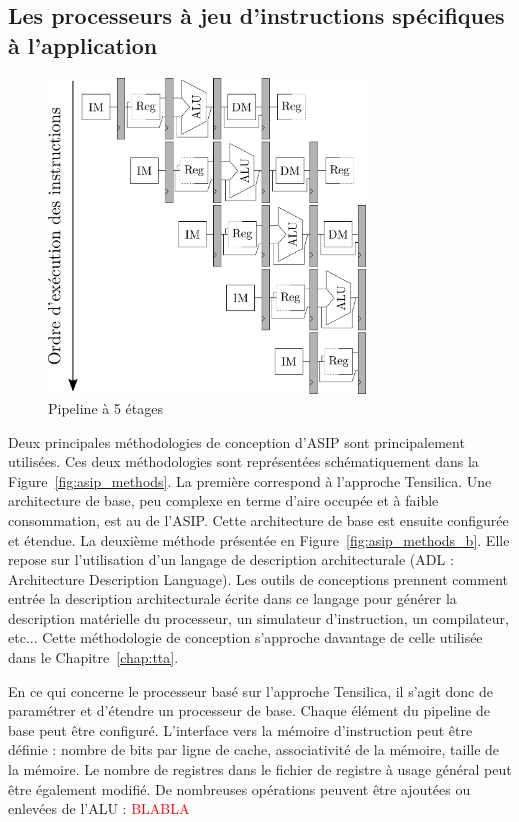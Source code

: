 \subsection{Les processeurs à jeu d'instructions spécifiques à l'application}
\begin{figure}[t]
\centering
\includegraphics[width=0.75\textwidth]{main/ch3_fig/pipelines}
\caption{Pipeline à 5 étages}
\end{figure}
Deux principales méthodologies de conception d'ASIP sont principalement utilisées. Ces deux méthodologies sont représentées schématiquement dans la Figure~\ref{fig:asip_methods}. La première correspond à l'approche Tensilica. Une architecture de base, peu complexe en terme d'aire occupée et à faible consommation, est au \coeur de l'ASIP. Cette architecture de base est ensuite configurée et étendue. La deuxième méthode présentée en Figure~\ref{fig:asip_methods_b}. Elle repose sur l'utilisation d'un langage de description architecturale (ADL : Architecture Description Language). Les outils de conceptions prennent comment entrée la description architecturale écrite dans ce langage pour générer la description matérielle du processeur, un simulateur d'instruction, un compilateur, etc... Cette méthodologie de conception s'approche davantage de celle utilisée dans le Chapitre~\ref{chap:tta}.

En ce qui concerne le processeur basé sur l'approche Tensilica, il s'agit donc de paramétrer et d'étendre un processeur de base. Chaque élément du pipeline de base peut être configuré.
L'interface vers la mémoire d'instruction peut être définie : nombre de bits par ligne de cache, associativité de la mémoire, taille de la mémoire. Le nombre de registres dans le fichier de registre à usage général peut être également modifié. De nombreuses opérations peuvent être ajoutées ou enlevées de l'ALU : \textcolor{red}{BLABLA}


